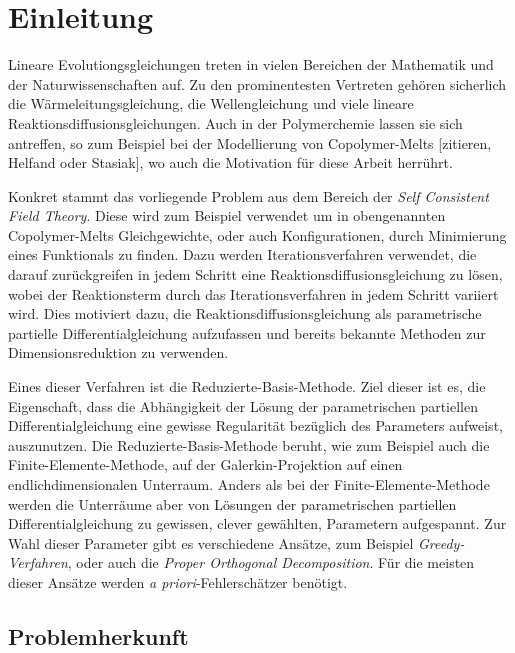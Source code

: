 
\chapter{Einleitung} %
\label{cha:einleitung}

Lineare Evolutiongsgleichungen treten in vielen Bereichen der Mathematik und der Naturwissenschaften auf.
Zu den prominentesten Vertreten gehören sicherlich die Wärmeleitungsgleichung, die Wellengleichung und viele lineare Reaktionsdiffusionsgleichungen.
Auch in der Polymerchemie lassen sie sich antreffen, so zum Beispiel bei der Modellierung von Copolymer-Melts [zitieren, Helfand oder Stasiak], wo auch die Motivation für diese Arbeit herrührt.

Konkret stammt das vorliegende Problem aus dem Bereich der \emph{Self Consistent Field Theory}.
Diese wird zum Beispiel verwendet um in obengenannten Copolymer-Melts Gleichgewichte, oder auch Konfigurationen, durch Minimierung eines Funktionals zu finden.
Dazu werden Iterationsverfahren verwendet, die darauf zurückgreifen in jedem Schritt eine Reaktionsdiffusionsgleichung zu lösen, wobei der Reaktionsterm durch das Iterationsverfahren in jedem Schritt variiert wird.
Dies motiviert dazu, die Reaktionsdiffusionsgleichung als parametrische partielle Differentialgleichung aufzufassen und bereits bekannte Methoden zur Dimensionsreduktion zu verwenden.

Eines dieser Verfahren ist die Reduzierte-Basis-Methode.
Ziel dieser ist es, die Eigenschaft, dass die Abhängigkeit der Lösung der parametrischen partiellen Differentialgleichung eine gewisse Regularität bezüglich des Parameters aufweist, auszunutzen.
Die Reduzierte-Basis-Methode beruht, wie zum Beispiel auch die Finite-Elemente-Methode, auf der Galerkin-Projektion auf einen endlichdimensionalen Unterraum.
Anders als bei der Finite-Elemente-Methode werden die Unterräume aber von Lösungen der parametrischen partiellen Differentialgleichung zu gewissen, clever gewählten, Parametern aufgespannt.
Zur Wahl dieser Parameter gibt es verschiedene Ansätze, zum Beispiel \emph{Greedy-Verfahren}, oder auch die \emph{Proper Orthogonal Decomposition}.
Für die meisten dieser Ansätze werden \emph{a priori}-Fehlerschätzer benötigt.

\section{Problemherkunft} %
\label{sec:problemherkunft}

